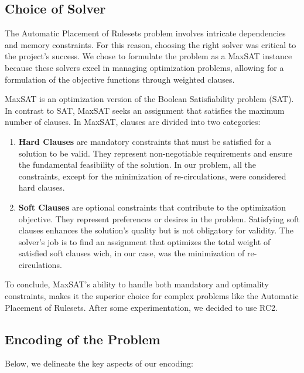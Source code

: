 \subsection{Choice of Solver}

The Automatic Placement of Rulesets problem involves intricate dependencies and memory constraints. For this reason, choosing the right solver was critical to the project's success. We chose to formulate the problem as a MaxSAT instance because these solvers excel in managing optimization problems, allowing for a formulation of the objective functions through weighted clauses.

MaxSAT is an optimization version of the Boolean Satisfiability problem (SAT). In contrast to SAT, MaxSAT seeks an assignment that satisfies the maximum number of clauses. In MaxSAT, clauses are divided into two categories:

\begin{enumerate}
    \item \textbf{Hard Clauses} are mandatory constraints that must be satisfied for a solution to be valid. They represent non-negotiable requirements and ensure the fundamental feasibility of the solution. In our problem, all the constraints, except for the minimization of re-circulations, were considered hard clauses.

    \item \textbf{Soft Clauses} are optional constraints that contribute to the optimization objective. They represent preferences or desires in the problem. Satisfying soft clauses enhances the solution's quality but is not obligatory for validity. The solver's job is to find an assignment that optimizes the total weight of satisfied soft clauses wich, in our case, was the minimization of re-circulations.
\end{enumerate}

To conclude, MaxSAT's ability to handle both mandatory and optimality constraints, makes it the superior choice for complex problems like the Automatic Placement of Rulesets. After some experimentation, we decided to use RC2.

\subsection{Encoding of the Problem}

Below, we delineate the key aspects of our encoding:

